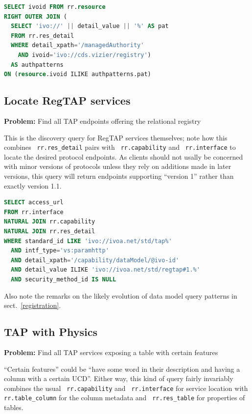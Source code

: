 \documentclass[11pt,a4paper]{ivoa}
\newcommand{\rtent}[1]{\texttt{\color{rtcolor} #1}}
\begin{document}
\begin{lstlisting}[language=SQL,flexiblecolumns=true]
SELECT ivoid FROM rr.resource
RIGHT OUTER JOIN (
  SELECT 'ivo://' || detail_value || '%' AS pat
  FROM rr.res_detail
  WHERE detail_xpath='/managedAuthority' 
    AND ivoid='ivo://cds.vizier/registry') 
  AS authpatterns
ON (resource.ivoid ILIKE authpatterns.pat)
\end{lstlisting}

\subsection{Locate RegTAP services}

\textbf{Problem:} Find all TAP endpoints offering the relational
registry

This is the discovery query for RegTAP services themselves;  note how
this combines 
\rtent{rr.res\_detail} pairs with
\rtent{rr.capability}
and 
\rtent{rr.interface} to locate the desired protocol
endpoints.  As clients should not usally be concerned with minor
versions of protocols unless  they rely on additions made in later
versions, this query will return endpoints supporting ``version 1'' rather
than exactly version 1.1.


\begin{lstlisting}[language=SQL,flexiblecolumns=true]
SELECT access_url
FROM rr.interface
NATURAL JOIN rr.capability
NATURAL JOIN rr.res_detail
WHERE standard_id LIKE 'ivo://ivoa.net/std/tap%'
  AND intf_type='vs:paramhttp'
  AND detail_xpath='/capability/dataModel/@ivo-id'
  AND detail_value ILIKE 'ivo://ivoa.net/std/regtap#1.%'
  AND security_method_id IS NULL
\end{lstlisting}

Also note the remarks on the likely evolution of data model query
patterns in sect.~\ref{registration}.

\subsection{TAP with Physics}

\textbf{Problem:} Find all TAP services
exposing a table with certain features

``Certain features'' could be ``have some word in their description
and having a column with a certain UCD''.  Either way, this kind of query
fairly invariably combines the usual 
\rtent{rr.capability} and 
\rtent{rr.interface}
 for service location with
\rtent{rr.table\_column}
 for the column metadata
and 
\rtent{rr.res\_table} for properties of tables.
\end{document}
